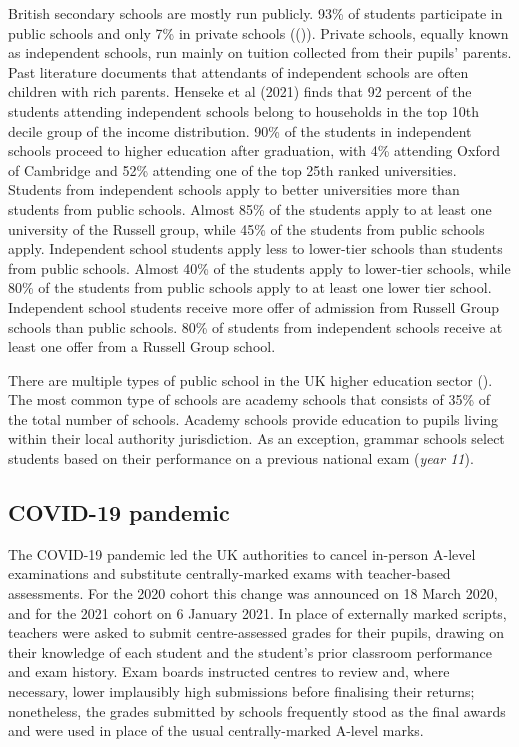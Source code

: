 British secondary schools are mostly run publicly. 93\% of students participate in public schools and only 7\% in private schools (()). Private schools, equally known as independent schools, run mainly on tuition collected from their pupils' parents. Past literature documents that attendants of independent schools are often children with rich parents. Henseke et al (2021) finds that 92 percent of the students attending independent schools belong to households in the top 10th decile group of the income distribution. 90\% of the students in independent schools proceed to higher education after graduation, with 4\% attending Oxford of Cambridge and 52\% attending one of the top 25th ranked universities. Students from independent schools apply to better universities more than students from public schools. Almost 85\% of the students apply to at least one university of the Russell group, while 45\% of the students from public schools apply. Independent school students apply less to lower-tier schools than students from public schools. Almost 40\% of the students apply to lower-tier schools, while 80\% of the students from public schools apply to at least one lower tier school. Independent school students receive more offer of admission from Russell Group schools than public schools. 80\% of students from independent schools receive at least one offer from a Russell Group school. 

There are multiple types of public school in the UK higher education sector (). The most common type of schools are academy schools that consists of 35\% of the total number of schools. Academy schools provide education to pupils living within their local authority jurisdiction. As an exception, grammar schools select students based on their performance on a previous national exam (\emph{year 11}). 

\subsection{COVID-19 pandemic}
The COVID-19 pandemic led the UK authorities to cancel in-person A-level examinations and substitute centrally-marked exams with teacher-based assessments. For the 2020 cohort this change was announced on 18 March 2020, and for the 2021 cohort on 6 January 2021. In place of externally marked scripts, teachers were asked to submit centre-assessed grades for their pupils, drawing on their knowledge of each student and the student’s prior classroom performance and exam history. Exam boards instructed centres to review and, where necessary, lower implausibly high submissions before finalising their returns; nonetheless, the grades submitted by schools frequently stood as the final awards and were used in place of the usual centrally-marked A-level marks.


